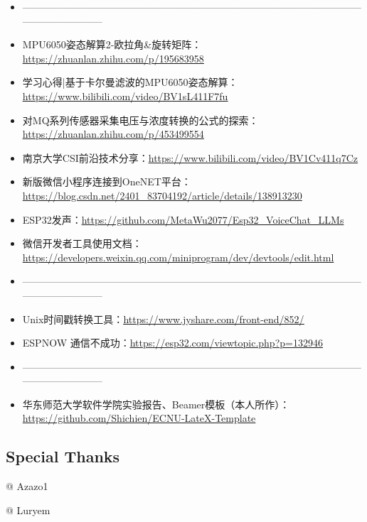 \begin{itemize}
    \item ——————————————————————————————————————————
    \item MPU6050姿态解算2-欧拉角\&旋转矩阵：\href{https://zhuanlan.zhihu.com/p/195683958}{\underline{https://zhuanlan.zhihu.com/p/195683958}}
    \item 学习心得|基于卡尔曼滤波的MPU6050姿态解算：\href{https://www.bilibili.com/video/BV1sL411F7fu}{\underline{https://www.bilibili.com/video/BV1sL411F7fu}}
    \item 对MQ系列传感器采集电压与浓度转换的公式的探索：\href{https://zhuanlan.zhihu.com/p/453499554}{\underline{https://zhuanlan.zhihu.com/p/453499554}}
    \item 南京大学CSI前沿技术分享：\href{https://www.bilibili.com/video/BV1Cv411q7Cz}{\underline{https://www.bilibili.com/video/BV1Cv411q7Cz}}
    \item 新版微信小程序连接到OneNET平台：\href{https://blog.csdn.net/2401\_83704192/article/details/138913230}{https://blog.csdn.net/2401\_83704192/article/details/138913230}
    \item ESP32发声：\href{https://github.com/MetaWu2077/Esp32\_VoiceChat\_LLMs}{https://github.com/MetaWu2077/Esp32\_VoiceChat\_LLMs}
    \item 微信开发者工具使用文档：\href{https://developers.weixin.qq.com/miniprogram/dev/devtools/edit.html}{https://developers.weixin.qq.com/miniprogram/dev/devtools/edit.html}
    \item ——————————————————————————————————————————
    \item Unix时间戳转换工具：\href{https://www.jyshare.com/front-end/852/}{\underline{https://www.jyshare.com/front-end/852/}}
    \item ESPNOW 通信不成功：\href{https://esp32.com/viewtopic.php?p=132946}{\underline{https://esp32.com/viewtopic.php?p=132946}}
    \item ——————————————————————————————————————————
    \item 华东师范大学软件学院实验报告、Beamer模板（本人所作）：\href{https://github.com/Shichien/ECNU-LateX-Template}{https://github.com/Shichien/ECNU-LateX-Template}
\end{itemize}

\subsection*{Special Thanks}
 @ Azazo1

 @ Luryem